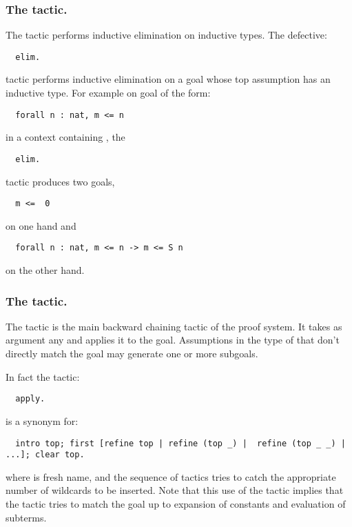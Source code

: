 \subsubsection*{The  tactic.}

The  tactic performs
inductive elimination on inductive types.
The defective:
\begin{lstlisting}
  elim.
\end{lstlisting}
tactic performs inductive elimination on a goal whose top assumption
has an inductive type. For example on goal of the form:
\begin{lstlisting}
  forall n : nat, m <= n
\end{lstlisting}
 in a context containing , the
\begin{lstlisting}
  elim.
\end{lstlisting}
tactic produces two goals,
\begin{lstlisting}
  m <=  0
\end{lstlisting}
on one hand and
\begin{lstlisting}
  forall n : nat, m <= n -> m <= S n
\end{lstlisting}
on the other hand.


\subsubsection*{The  tactic.}\label{sssec:apply}

The  tactic is the main
backward chaining tactic of the proof system. It takes as argument any
 and applies it to the goal.
Assumptions in the type of  that don't directly match the
goal may generate one or more subgoals.

In fact the \ssr{} tactic:
\begin{lstlisting}
  apply.
\end{lstlisting}
is a synonym for:
\begin{lstlisting}
  intro top; first [refine top | refine (top _) |  refine (top _ _) | ...]; clear top.
\end{lstlisting}
where  is fresh name, and the sequence of  tactics
tries to catch the appropriate number of wildcards to be inserted.
Note that this use of the  tactic implies that the tactic
tries to match the goal up to expansion of
constants and evaluation of subterms.

